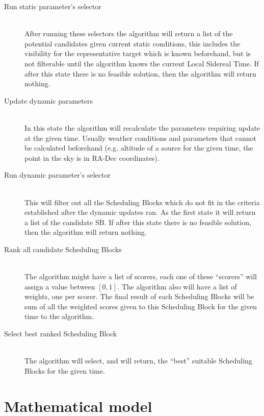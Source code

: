 \begin{description}
\item[Run static parameter's selector] \hfill \\
After running these selectors the algorithm will return a list of the potential candidates given current static conditions, this includes the visibility for the representative target which is known beforehand, but is not filterable until the algorithm knows the current Local Sidereal Time. If after this state there is no feasible solution, then the algorithm will return nothing.

\item[Update dynamic parameters] \hfill \\
In this state the algorithm will recalculate the parameters requiring update at the given time. Usually weather conditions and parameters that cannot be calculated beforehand (e.g. altitude of a source for the given time, the point in the sky is in RA-Dec coordinates).  

\item[Run dynamic parameter's selector] \hfill \\
This will filter out all the Scheduling Blocks which do not fit in the criteria established after the dynamic updates ran. As the first state it will return a list of the candidate SB. If after this state there is no feasible solution, then the algorithm will return nothing.

\item[Rank all candidate Scheduling Blocks] \hfill \\
The algorithm might have a list of scorers, each one of these ``scorers'' will assign a value between ${[ 0 , 1 ]}$. The algorithm also will have a list of weights, one per scorer. The final result of each Scheduling Blocks will be sum of all the weighted scores given to this Scheduling Block for the given time to the algorithm.

\item[Select best ranked Scheduling Block] \hfill \\
The algorithm will select, and will return, the ``best'' suitable Scheduling Blocks for the given time.

\end{description}

\section{Mathematical model}
\label{sec:array-sched-math-model}

